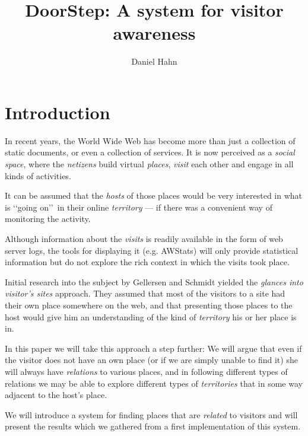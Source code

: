 \documentclass[a4paper]{danarticle}
\begin{document}
  \author{Daniel Hahn}
  \title{DoorStep: A system for visitor awareness}
  \maketitle
  
  \section{Introduction}
    In recent years, the World Wide Web has become more than just a collection
    of static documents, or even a collection of services. It is now perceived
    as a \textit{social space}, where the \textit{netizens} build virtual
    \textit{places}, \textit{visit} each other and engage in all kinds of
    activities.
    
    It can be assumed that the \textit{hosts} of those places would be
    very interested in what is \lq\lq going on\rq\rq\ in their online
    \textit{territory} --- if
    there was a convenient way of monitoring the activity. 
    
    Although
    information about the \textit{visits} is readily available in the
    form of web server logs, the tools for displaying it (e.g. AWStats) will only
    provide statistical information but do not explore the rich context in which
    the visits took place. 
    
    Initial research into the subject by Gellersen and Schmidt\cite{webaware}
    yielded the
    \textit{glances into visitor's sites} approach. They assumed that most of
    the visitors to a site had their own place somewhere on the web, and that
    presenting those places to the host would give him an understanding of the
    kind of \textit{territory} his or her place is in.
    
    In this paper we will take this approach a step further: We will argue that
    even if the visitor does not have an own place (or if we are
    simply unable to find it) she will always have \textit{relations} to various
    places, and in following different types of relations we may be able to
    explore different types of \textit{territories} that in some way adjacent to
    the host's place.
    
    We will introduce a system for finding places that are \textit{related} to
    visitors and will present the results which we gathered from a first
    implementation of this system.
\end{document}
